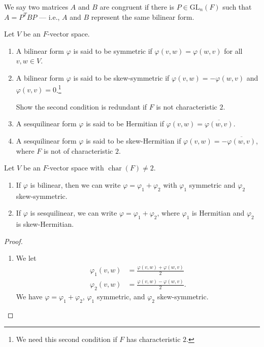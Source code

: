\documentclass[10pt]{mypackage}
\begin{document}
  \begin{definition}
    We say two matrices $A$ and $B$ are congruent if there is $P\in \text{GL}_{n}\left(F\right)$ such that $A = P^{T}BP$ --- i.e., $A$ and $B$ represent the same bilinear form.
  \end{definition}
  \begin{definition}[]
    Let $V$ be an $F$-vector space.
    \begin{enumerate}[(1)]
      \item A bilinear form $\varphi$ is said to be symmetric if $\varphi\left(v,w\right) = \varphi\left(w,v\right)$ for all $v,w\in V$.
      \item A bilinear form $\varphi$ is said to be skew-symmetric if $\varphi\left(v,w\right) = -\varphi\left(w,v\right)$ and $\varphi\left(v,v\right) = 0$.\footnote{We need this second condition if $F$ has characteristic $2$.}
        \begin{exercise}[]
          Show the second condition is redundant if $F$ is not characteristic $2$.
        \end{exercise}
      \item A sesquilinear form $\varphi$ is said to be Hermitian if $\varphi\left(v,w\right) = \overline{\varphi\left(w,v\right)}$.
      \item A sesquilinear form $\varphi$ is said to be skew-Hermitian if $\varphi\left(v,w\right) = -\overline{\varphi\left(w,v\right)}$, where $F$ is not of characteristic $2$.
    \end{enumerate}
  \end{definition}
  \begin{proposition}
    Let $V$ be an $F$-vector space with $\operatorname{char}(F) \neq 2$.
    \begin{enumerate}[(1)]
      \item If $\varphi$ is bilinear, then we can write $\varphi = \varphi_1 + \varphi_2$ with $\varphi_1$ symmetric and $\varphi_2$ skew-symmetric.
      \item If $\varphi$ is sesquilinear, we can write $\varphi = \varphi_1 + \varphi_2$, where $\varphi_1$ is Hermitian and $\varphi_2$ is skew-Hermitian.
    \end{enumerate}
  \end{proposition}
  \begin{proof}\hfill
    \begin{enumerate}[(1)]
      \item We let
        \begin{align*}
          \varphi_1(v,w) &= \frac{\varphi\left(v,w\right) + \varphi\left(w,v\right)}{2}\\
          \varphi_2\left(v,w\right) &= \frac{\varphi\left(v,w\right) - \varphi\left(w,v\right)}{2}.
        \end{align*}
        We have $\varphi = \varphi_1 + \varphi_2$, $\varphi_1$ symmetric, and $\varphi_2$ skew-symmetric.
    \end{enumerate}
  \end{proof}
\end{document}
